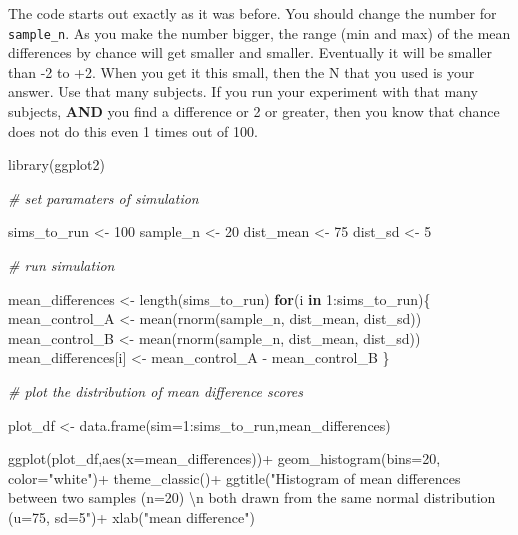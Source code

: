 \documentclass[
]{book}
\newenvironment{Shaded}{\begin{snugshade}}{\end{snugshade}}
\newcommand{\AttributeTok}[1]{\textcolor[rgb]{0.77,0.63,0.00}{#1}}
\newcommand{\CommentTok}[1]{\textcolor[rgb]{0.56,0.35,0.01}{\textit{#1}}}
\newcommand{\ControlFlowTok}[1]{\textcolor[rgb]{0.13,0.29,0.53}{\textbf{#1}}}
\newcommand{\DecValTok}[1]{\textcolor[rgb]{0.00,0.00,0.81}{#1}}
\newcommand{\FunctionTok}[1]{\textcolor[rgb]{0.00,0.00,0.00}{#1}}
\newcommand{\NormalTok}[1]{#1}
\newcommand{\OtherTok}[1]{\textcolor[rgb]{0.56,0.35,0.01}{#1}}
\newcommand{\SpecialCharTok}[1]{\textcolor[rgb]{0.00,0.00,0.00}{#1}}
\newcommand{\StringTok}[1]{\textcolor[rgb]{0.31,0.60,0.02}{#1}}
\begin{document}
The code starts out exactly as it was before. You should change the number for \texttt{sample\_n}. As you make the number bigger, the range (min and max) of the mean differences by chance will get smaller and smaller. Eventually it will be smaller than -2 to +2. When you get it this small, then the N that you used is your answer. Use that many subjects. If you run your experiment with that many subjects, \textbf{AND} you find a difference or 2 or greater, then you know that chance does not do this even 1 times out of 100.

\begin{Shaded}
\begin{Highlighting}[]
\FunctionTok{library}\NormalTok{(ggplot2)}

\CommentTok{\# set paramaters of simulation}

\NormalTok{sims\_to\_run }\OtherTok{\textless{}{-}} \DecValTok{100}
\NormalTok{sample\_n   }\OtherTok{\textless{}{-}} \DecValTok{20}
\NormalTok{dist\_mean  }\OtherTok{\textless{}{-}} \DecValTok{75}
\NormalTok{dist\_sd    }\OtherTok{\textless{}{-}} \DecValTok{5}

\CommentTok{\# run simulation}

\NormalTok{mean\_differences }\OtherTok{\textless{}{-}} \FunctionTok{length}\NormalTok{(sims\_to\_run)}
\ControlFlowTok{for}\NormalTok{(i }\ControlFlowTok{in} \DecValTok{1}\SpecialCharTok{:}\NormalTok{sims\_to\_run)\{}
\NormalTok{  mean\_control\_A      }\OtherTok{\textless{}{-}} \FunctionTok{mean}\NormalTok{(}\FunctionTok{rnorm}\NormalTok{(sample\_n, dist\_mean, dist\_sd))}
\NormalTok{  mean\_control\_B      }\OtherTok{\textless{}{-}} \FunctionTok{mean}\NormalTok{(}\FunctionTok{rnorm}\NormalTok{(sample\_n, dist\_mean, dist\_sd))}
\NormalTok{  mean\_differences[i] }\OtherTok{\textless{}{-}}\NormalTok{ mean\_control\_A }\SpecialCharTok{{-}}\NormalTok{ mean\_control\_B}
\NormalTok{\}}

\CommentTok{\# plot the  distribution of mean difference scores}

\NormalTok{plot\_df }\OtherTok{\textless{}{-}} \FunctionTok{data.frame}\NormalTok{(}\AttributeTok{sim=}\DecValTok{1}\SpecialCharTok{:}\NormalTok{sims\_to\_run,mean\_differences)}

\FunctionTok{ggplot}\NormalTok{(plot\_df,}\FunctionTok{aes}\NormalTok{(}\AttributeTok{x=}\NormalTok{mean\_differences))}\SpecialCharTok{+}
  \FunctionTok{geom\_histogram}\NormalTok{(}\AttributeTok{bins=}\DecValTok{20}\NormalTok{, }\AttributeTok{color=}\StringTok{"white"}\NormalTok{)}\SpecialCharTok{+}
  \FunctionTok{theme\_classic}\NormalTok{()}\SpecialCharTok{+}
  \FunctionTok{ggtitle}\NormalTok{(}\StringTok{"Histogram of mean differences between two samples (n=20) }\SpecialCharTok{\textbackslash{}n}
\StringTok{          both drawn from the same normal distribution (u=75, sd=5"}\NormalTok{)}\SpecialCharTok{+}
  \FunctionTok{xlab}\NormalTok{(}\StringTok{"mean difference"}\NormalTok{)}
\end{Highlighting}
\end{Shaded}
\end{document}
